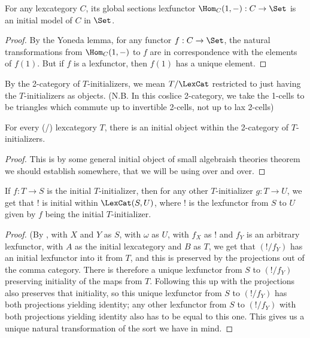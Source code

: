 \begin{lemma}\label{TermModelIsInitialForLex}
For any lexcategory $C$, its global sections lexfunctor $\Hom_C(1, -) : C \to \Set$ is an initial model of $C$ in $\Set$.
\end{lemma}
\begin{proof}
By the Yoneda lemma, for any functor $f : C \to \Set$, the natural transformations from $\Hom_C(1, -)$ to $f$ are in correspondence with the elements of $f(1)$. But if $f$ is a lexfunctor, then $f(1)$ has a unique element.
\end{proof}

By the 2-category of $T$-initializers, we mean $T/\LexCat$ restricted to just having the $T$-initializers as objects. (N.B. In this coslice 2-category, we take the 1-cells to be triangles which commute up to invertible 2-cells, not up to lax 2-cells)

\begin{theorem}
For every (\setsmall/) lexcategory $T$, there is an initial object within the 2-category of $T$-initializers.
\end{theorem}
\begin{proof}
This is by some general initial object of small algebraish theories theorem  we should establish somewhere, that we will be using over and over. \TODO
\end{proof}

\begin{theorem}
If $f : T \to S$ is the initial $T$-initializer, then for any other $T$-initializer $g : T \to U$, we get that $!$ is initial within $\LexCat(S, U)$, where $!$ is the lexfunctor from $S$ to $U$ given by $f$ being the initial $T$-initializer.
\end{theorem}
\begin{proof}
\TODO (By , with $X$ and $Y$ as $S$, with $\omega$ as $U$, with $f_X$ as $!$ and $f_Y$ is an arbitrary lexfunctor, with $A$ as the initial lexcategory and $B$ as $T$, we get that $(!/f_Y)$ has an initial lexfunctor into it from $T$, and this is preserved by the projections out of the comma category. There is therefore a unique lexfunctor from $S$ to $(!/f_Y)$ preserving initiality of the maps from $T$. Following this up with the projections also preserves that initiality, so this unique lexfunctor from $S$ to $(!/f_Y)$ has both projections yielding identity; any other lexfunctor from $S$ to $(!/f_Y)$ with both projections yielding identity also has to be equal to this one. This gives us a unique natural transformation of the sort we have in mind. 
\end{proof}

